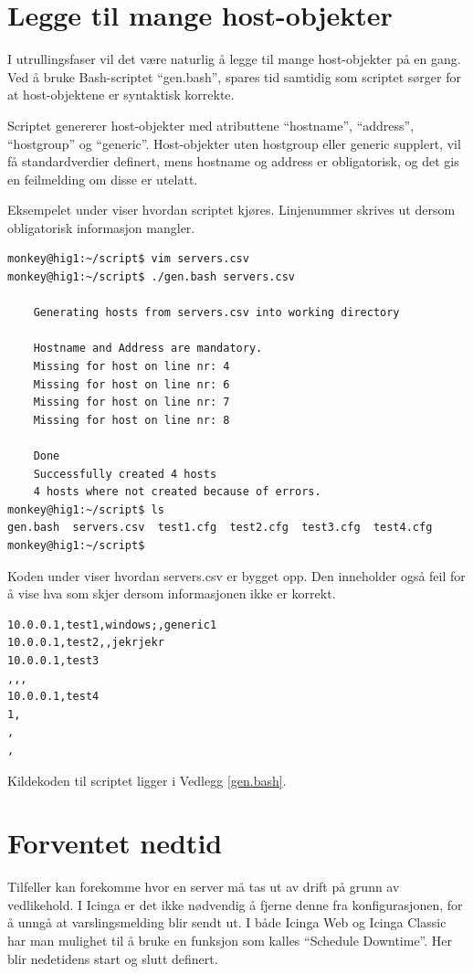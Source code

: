 \section{Legge til mange host-objekter}
I utrullingsfaser vil det være naturlig å legge til mange host-objekter på en gang. Ved å bruke Bash-scriptet ``gen.bash'', spares tid samtidig som scriptet sørger for at host-objektene er syntaktisk korrekte.

Scriptet genererer host-objekter med atributtene  ``hostname'', ``address'', ``hostgroup'' og ``generic''. Host-objekter uten hostgroup eller generic supplert, vil få standardverdier definert, mens hostname og address er obligatorisk, og det gis en feilmelding om disse er utelatt.

Eksempelet under viser hvordan scriptet kjøres. Linjenummer skrives ut dersom obligatorisk informasjon mangler.
\begin{lstlisting}[style=example]
monkey@hig1:~/script$ vim servers.csv
monkey@hig1:~/script$ ./gen.bash servers.csv

	Generating hosts from servers.csv into working directory

	Hostname and Address are mandatory.
	Missing for host on line nr: 4
	Missing for host on line nr: 6
	Missing for host on line nr: 7
	Missing for host on line nr: 8

	Done
	Successfully created 4 hosts
	4 hosts where not created because of errors.
monkey@hig1:~/script$ ls
gen.bash  servers.csv  test1.cfg  test2.cfg  test3.cfg  test4.cfg
monkey@hig1:~/script$
\end{lstlisting}

Koden under viser hvordan servers.csv er bygget opp. Den inneholder også feil for å vise hva som skjer dersom informasjonen ikke er korrekt.
\begin{lstlisting}
10.0.0.1,test1,windows;,generic1
10.0.0.1,test2,,jekrjekr
10.0.0.1,test3
,,,
10.0.0.1,test4
1,
,
,
\end{lstlisting}

Kildekoden til scriptet ligger i Vedlegg \ref{gen.bash}.

\section{Forventet nedtid}
Tilfeller kan forekomme hvor en server må tas ut av drift på grunn av vedlikehold. I Icinga er det ikke nødvendig å fjerne denne fra konfigurasjonen, for å unngå at varslingsmelding blir sendt ut. I både Icinga Web og Icinga Classic har man mulighet til å bruke en funksjon som kalles ``Schedule Downtime''. Her blir nedetidens start og slutt definert.

